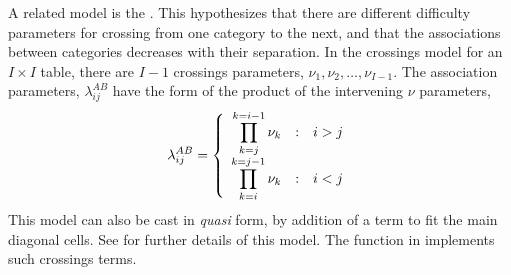 \documentclass[11pt]{book}\usepackage[]{graphicx}\usepackage[]{color}
\begin{document}
A related model is the  \citep{Goodman:1972}.
This hypothesizes that there are different difficulty parameters
for crossing from one category to the next, and that the associations
between categories decreases with their separation.
In the crossings model for an $I \times I$ table, there
are $I-1$ crossings parameters, $\nu_1, \nu_2, \dots, \nu_{I-1}$.
The association parameters, $\lambda_{ij}^{AB}$ have the form
of the product of the intervening $\nu$ parameters,
\begin{equation*}
\lambda_{ij}^{AB} = \left\{
\begin{array}{r@{\quad : \quad}l}
 \displaystyle \prod_{k=j}^{k=i-1} \nu_k & i>j \\
 \displaystyle \prod_{k=i}^{k=j-1} \nu_k & i<j
\end{array}
\right.
\end{equation*}
This model can also be cast in \emph{quasi} form, by addition of a
 term to fit the main diagonal cells.
See \citet[\S 4.4.7]{PowersXie:2008} for further details of this model.
The  function in  implements such crossings terms.
\end{document}
